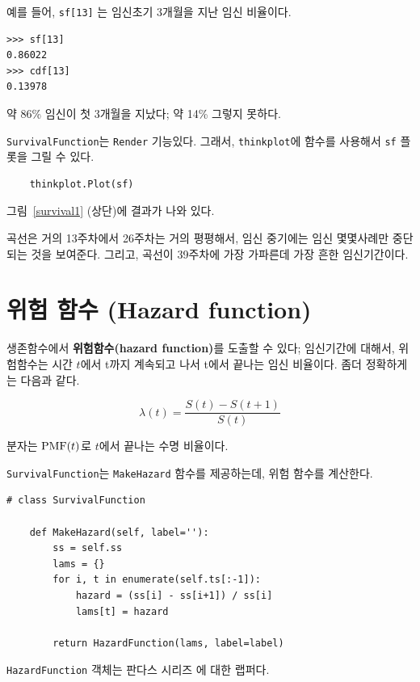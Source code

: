 예를 들어, {\tt sf[13]} 는 임신초기 3개월을 지난 임신 비율이다.

\begin{verbatim}
>>> sf[13]
0.86022
>>> cdf[13]
0.13978
\end{verbatim}

약 86\% 임신이 첫 3개월을 지났다; 약 14\% 그렇지 못하다.

{\tt SurvivalFunction}는 {\tt Render} 기능있다. 그래서,
{\tt thinkplot}에 함수를 사용해서 {\tt sf} 플롯을 그릴 수 있다.

\begin{verbatim}
    thinkplot.Plot(sf)
\end{verbatim}

그림~\ref{survival1} (상단)에 결과가 나와 있다.

곡선은 거의 13주차에서 26주차는 거의 평평해서, 임신 중기에는 임신 몇몇사례만 중단되는 것을 보여준다. 그리고, 곡선이 39주차에 가장 가파른데 가장 흔한 임신기간이다.


\section{위험 함수 (Hazard function)}
\label{hazard}

생존함수에서 {\bf 위험함수(hazard function)}를 도출할 수 있다; 임신기간에 대해서, 위험함수는 시간 $t$에서 t까지 계속되고 나서 t에서 끝나는 임신 비율이다. 좀더 정확하게는 다음과 같다.

%
\[ \lambda(t) = \frac{S(t) - S(t+1)}{S(t)} \]
%

분자는 $\mathrm{PMF}(t)$로 $t$에서 끝나는 수명 비율이다.

{\tt SurvivalFunction}는 {\tt MakeHazard} 함수를 제공하는데, 위험 함수를 계산한다.

\begin{verbatim}
# class SurvivalFunction

    def MakeHazard(self, label=''):
        ss = self.ss
        lams = {}
        for i, t in enumerate(self.ts[:-1]):
            hazard = (ss[i] - ss[i+1]) / ss[i]
            lams[t] = hazard

        return HazardFunction(lams, label=label)
\end{verbatim}

{\tt HazardFunction} 객체는 판다스 시리즈 에 대한 랩퍼다. 

